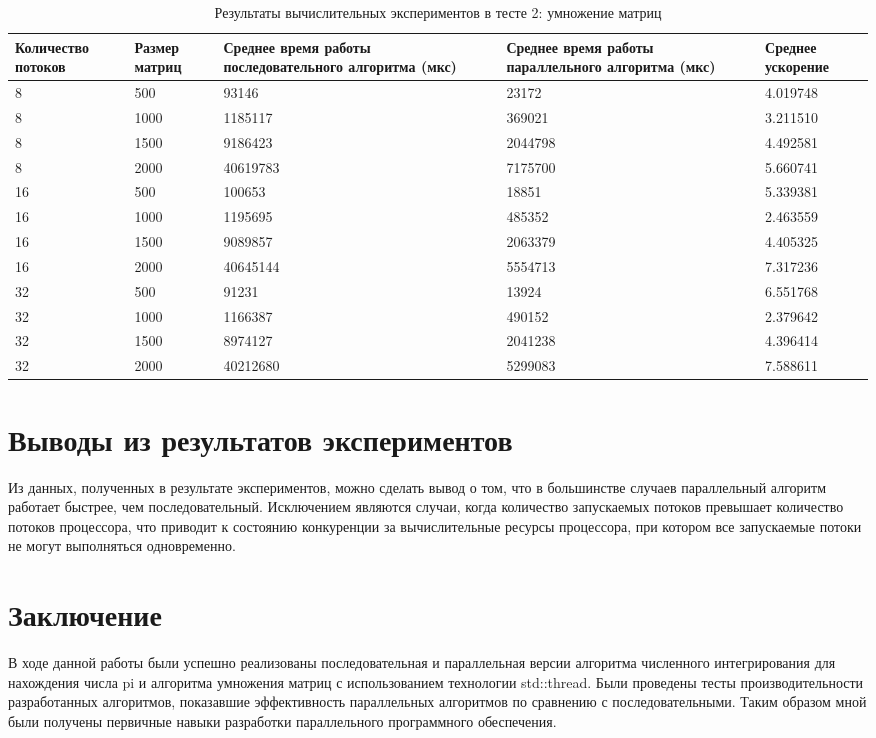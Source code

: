 \documentclass{report}
\begin{document}
\begin{table}[H]
\caption{Результаты вычислительных экспериментов в тесте 2: умножение матриц}
\centering
\begin{tabular}{| m{2cm} | m{2cm} | m{4.5cm} | m{4.5cm} | m{2cm} |}
\toprule
Количество потоков & Размер матриц & Среднее время работы последовательного алгоритма (мкс) & Среднее время работы параллельного алгоритма (мкс) & Среднее ускорение  \\
\midrule
8  & 500  & 93146    & 23172   & 4.019748 \\
8  & 1000 & 1185117  & 369021  & 3.211510 \\
8  & 1500 & 9186423  & 2044798 & 4.492581 \\
8  & 2000 & 40619783 & 7175700 & 5.660741 \\
16 & 500  & 100653   & 18851   & 5.339381 \\
16 & 1000 & 1195695  & 485352  & 2.463559 \\
16 & 1500 & 9089857  & 2063379 & 4.405325 \\
16 & 2000 & 40645144 & 5554713 & 7.317236 \\
32 & 500  & 91231    & 13924   & 6.551768 \\
32 & 1000 & 1166387  & 490152  & 2.379642 \\
32 & 1500 & 8974127  & 2041238 & 4.396414 \\
32 & 2000 & 40212680 & 5299083 & 7.588611 \\
\bottomrule
\end{tabular}
\end{table}
\clearpage

\section*{Выводы из результатов экспериментов}
\par Из данных, полученных в результате экспериментов, можно сделать вывод о том, что в большинстве случаев параллельный алгоритм работает быстрее, чем последовательный. Исключением являются случаи, когда количество запускаемых потоков превышает количество потоков процессора, что приводит к состоянию конкуренции за вычислительные ресурсы процессора, при котором все запускаемые потоки не могут выполняться одновременно.
\clearpage

\section*{Заключение}
\par В ходе данной работы были успешно реализованы последовательная и параллельная версии алгоритма численного интегрирования для нахождения числа pi и алгоритма умножения матриц с использованием технологии std::thread. Были проведены тесты производительности разработанных алгоритмов, показавшие эффективность параллельных алгоритмов по сравнению с последовательными. Таким образом мной были получены первичные навыки разработки параллельного программного обеспечения.
\clearpage
\end{document}

